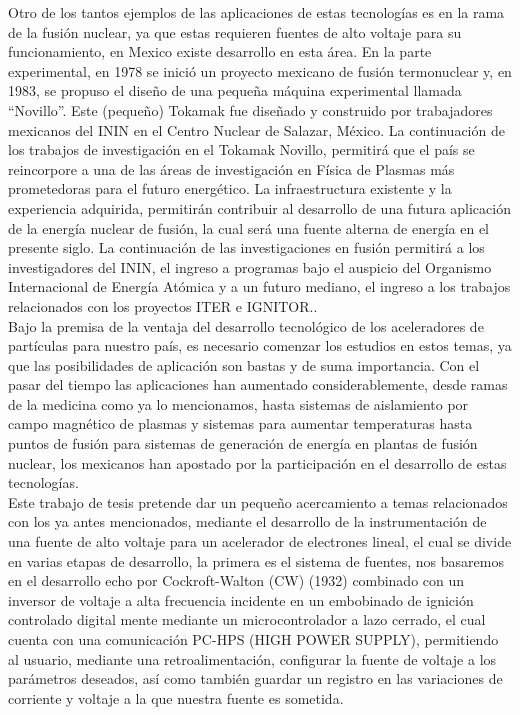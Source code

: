 Otro de los tantos ejemplos de las aplicaciones de estas tecnologías es en la rama de la fusión nuclear, ya que estas requieren fuentes de alto voltaje para su funcionamiento, en Mexico existe desarrollo en esta área. En la parte experimental, en 1978 se inició un proyecto mexicano de fusión termonuclear y, en 1983, se propuso el diseño de una pequeña máquina experimental llamada “Novillo”. Este (pequeño) Tokamak fue diseñado y construido por trabajadores mexicanos del ININ en el Centro Nuclear de Salazar, México. La continuación de los trabajos de investigación en el Tokamak Novillo, permitirá que el país se reincorpore a una de las áreas de investigación en Física de Plasmas más prometedoras para el futuro energético. La infraestructura existente y la experiencia adquirida, permitirán contribuir al desarrollo de una futura aplicación de la energía nuclear de fusión, la cual será una fuente alterna de energía en el presente siglo. La continuación de las investigaciones en fusión permitirá a los investigadores del ININ, el ingreso a programas bajo el auspicio del Organismo Internacional de Energía Atómica y a un futuro mediano, el ingreso a los trabajos relacionados con los proyectos ITER e IGNITOR.\cite{ININ}.\\

Bajo la premisa de la ventaja del desarrollo tecnológico de los aceleradores de partículas para nuestro país, es necesario comenzar los estudios en estos temas, ya que las posibilidades de aplicación son bastas y de suma importancia. Con el pasar del tiempo las aplicaciones han aumentado considerablemente, desde ramas de la medicina como ya lo mencionamos, hasta sistemas de aislamiento por campo magnético de plasmas y sistemas para aumentar temperaturas hasta puntos de fusión para sistemas de generación de energía en plantas de fusión nuclear, los mexicanos han apostado por la participación en el desarrollo de estas tecnologías.\\

Este trabajo de tesis pretende dar un pequeño acercamiento a temas relacionados con los ya antes mencionados, mediante el desarrollo de la instrumentación de una fuente de alto voltaje para un acelerador de electrones lineal, el cual se divide en varias etapas de desarrollo, la primera es el sistema de fuentes, nos basaremos en el desarrollo echo por Cockroft-Walton (CW) (1932) combinado con un inversor de voltaje a alta frecuencia incidente en un embobinado de ignición controlado digital mente mediante un microcontrolador a lazo cerrado, el cual cuenta con una comunicación PC-HPS (HIGH POWER SUPPLY), permitiendo al usuario, mediante una retroalimentación, configurar la fuente de voltaje a los parámetros deseados, así como también guardar un registro en las variaciones de corriente y voltaje a la que nuestra fuente es sometida. \\
\newpage


